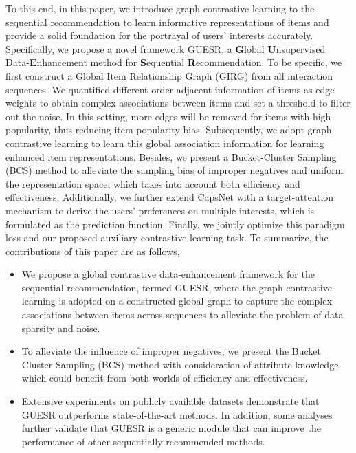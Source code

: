 \documentclass[runningheads]{llncs}
\begin{document}
To this end, in this paper, we introduce graph contrastive learning to the sequential recommendation to learn informative representations of items and provide a solid foundation for the portrayal of users' interests accurately. Specifically, we propose a novel framework GUESR, a \textbf{G}lobal \textbf{U}nsupervised Data-\textbf{E}nhancement method for \textbf{S}equential \textbf{R}ecommendation. To be specific, we first construct a Global Item Relationship Graph (GIRG) from all interaction sequences. We quantified different order adjacent information of items as edge weights to obtain complex associations between items and set a threshold to filter out the noise. In this setting, more edges will be removed for items with high popularity, thus reducing item popularity bias. Subsequently, we adopt graph contrastive learning to learn this global association information for learning enhanced item representations. Besides, we present a Bucket-Cluster Sampling (BCS) method to alleviate the sampling bias of improper negatives and uniform the representation space, which takes into account both efficiency and effectiveness. Additionally, we further extend CapsNet \cite{capsulenet} with a target-attention mechanism to derive the users' preferences on multiple interests, which is formulated as the prediction function. Finally, we jointly optimize this paradigm loss and our proposed auxiliary contrastive learning task. To summarize, the contributions of this paper are as follows,
\begin{itemize}

\item We propose a global contrastive data-enhancement framework for the sequential recommendation, termed GUESR, where the graph contrastive learning is adopted on a constructed global graph to capture the complex associations between items across sequences to alleviate the problem of data sparsity and noise. 
\item To alleviate the influence of improper negatives, we present the Bucket Cluster Sampling (BCS) method with consideration of attribute knowledge, which could benefit from both worlds of efficiency and effectiveness.
\item Extensive experiments on publicly available datasets demonstrate that GUESR outperforms state-of-the-art methods. In addition, some analyses further validate that GUESR is a generic module that can improve the performance of other sequentially recommended methods.
\end{itemize}
\end{document}
